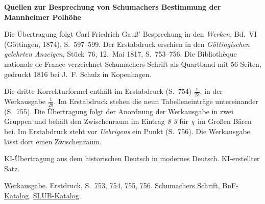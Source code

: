 \clearpage\thispagestyle{empty}
\begin{center}\Large\bfseries Quellen zur Besprechung von Schumachers Bestimmung der Mannheimer Polhöhe\end{center}

Die Übertragung folgt Carl Friedrich Gauß’ Besprechung in den \emph{Werken}, Bd.~VI (Göttingen, 1874), S.~597--599. Der Erstabdruck erschien in den \emph{Göttingischen gelehrten Anzeigen}, Stück~76, 12.~Mai 1817, S.~753--756. Die Bibliothèque nationale de France verzeichnet Schumachers Schrift als Quartband mit 56 Seiten, gedruckt 1816 bei J.~F. Schulz in Kopenhagen.

Die dritte Korrekturformel enthält im Erstabdruck (S.~754) $\frac{1}{23}$, in der Werkausgabe $\frac{1}{28}$. Im Erstabdruck stehen die neun Tabelleneinträge untereinander (S.~755). Die Übertragung folgt der Anordnung der Werkausgabe in zwei Gruppen und behält den Zwischenraum im Eintrag \emph{8 3} für $\chi$ im Großen Bären bei. Im Erstabdruck steht vor \emph{Uebrigens} ein Punkt (S.~756). Die Werkausgabe lässt dort einen Zwischenraum.

KI-Übertragung aus dem historischen Deutsch in modernes Deutsch. KI-erstellter Satz.

\href{https://gdz.sub.uni-goettingen.de/id/PPN236007467}{Werkausgabe}. Erstdruck, S.~\href{https://images.p.sub.uni-goettingen.de/iiif/image/gdz:PPN319721507_1817:00000765/full/1650,/0/default.jpg}{753}, \href{https://images.p.sub.uni-goettingen.de/iiif/image/gdz:PPN319721507_1817:00000766/full/1650,/0/default.jpg}{754}, \href{https://images.p.sub.uni-goettingen.de/iiif/image/gdz:PPN319721507_1817:00000767/full/1650,/0/default.jpg}{755}, \href{https://images.p.sub.uni-goettingen.de/iiif/image/gdz:PPN319721507_1817:00000768/full/1650,/0/default.jpg}{756}. \href{https://catalogue.bnf.fr/ark:/12148/cb31334340p}{Schumachers Schrift, BnF-Katalog}. \href{https://katalog.slub-dresden.de/en/id/0-1132488389}{SLUB-Katalog}.

\clearpage
